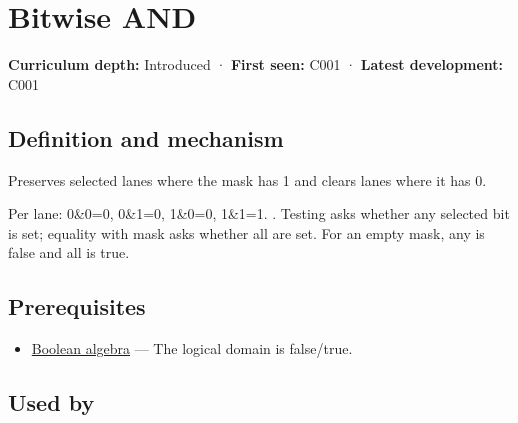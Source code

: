 \hypertarget{appendix-68b52453737c}{}\label{referencestart:appendix-68b52453737c}
\section{Bitwise AND}\label{appendix-68b52453737c-bitwise-and}

\hypertarget{appendix-68b52453737c-bitwise-and}{}

\textbf{Curriculum depth:} Introduced · \textbf{First seen:} C001 · \textbf{Latest development:} C001

\begin{allmightroledefinition}

\subsection{Definition and mechanism}\label{appendix-68b52453737c-definition-and-mechanism}

\hypertarget{appendix-68b52453737c-definition-and-mechanism}{}

Preserves selected lanes where the mask has 1 and clears lanes where it has 0.

\end{allmightroledefinition}

Per lane: 0\&0=0, 0\&1=0, 1\&0=0, 1\&1=1. . Testing  asks whether any selected bit is set; equality with mask asks whether all are set. For an empty mask, any is false and all is true.

\subsection{Prerequisites}\label{appendix-68b52453737c-prerequisites}

\hypertarget{appendix-68b52453737c-prerequisites}{}

\begin{itemize}
\tightlist
\item
  \hyperref[appendix-24475e1596a8]{Boolean algebra} --- The logical domain is false/true.
\end{itemize}

\subsection{Used by}\label{appendix-68b52453737c-used-by}

\hypertarget{appendix-68b52453737c-used-by}{}

